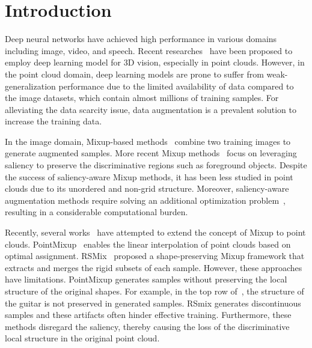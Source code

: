 \documentclass{article}
\begin{document}
\section{Introduction}
\label{sec:intro}
Deep neural networks have achieved high performance in various domains including image, video, and speech.
Recent researches~\cite{li2018pointcnn, liu2019relation,qi2017pointnet,qi2017pointnet++,thomas2019kpconv,wang2019dynamic} have been proposed to employ deep learning model for 3D vision, especially in point clouds.
However, in the point cloud domain, deep learning models are prone to suffer from weak-generalization performance due to the limited availability of data compared to the image datasets, which contain almost millions of training samples.
For alleviating the data scarcity issue, data augmentation is a prevalent solution to increase the training data.

In the image domain, Mixup-based methods~\cite{verma2019manifold, yun2019cutmix, DBLP:conf/iclr/ZhangCDL18} combine two training images to generate augmented samples. More recent Mixup methods~\cite{gong2021keepaugment,kim2020puzzle, DBLP:conf/iclr/KimCJS21, DBLP:conf/iclr/UddinMSCB21} focus on leveraging saliency to preserve the discriminative regions such as foreground objects. Despite the success of saliency-aware Mixup methods, it has been less studied in point clouds due to its unordered and non-grid structure.
Moreover, saliency-aware augmentation methods require solving an additional optimization problem~\cite{kim2020puzzle, DBLP:conf/iclr/KimCJS21}, resulting in a considerable computational burden.

Recently, several works~\cite{chen2020pointmixup, lee2021regularization,zhang2022pointcutmix} have attempted to extend the concept of Mixup to point clouds. PointMixup~\cite{chen2020pointmixup} enables the linear interpolation of point clouds based on optimal assignment. RSMix~\cite{lee2021regularization} proposed a shape-preserving Mixup framework that extracts and merges the rigid subsets of each sample.
However, these approaches have limitations. 
PointMixup generates samples without preserving the local structure of the original shapes. 
For example, in the top row of~, the structure of the guitar is not preserved in generated samples.
RSmix generates discontinuous samples and these artifacts often hinder effective training.
Furthermore, these methods disregard the saliency, thereby causing the loss of the discriminative local structure in the original point cloud.
\end{document}
